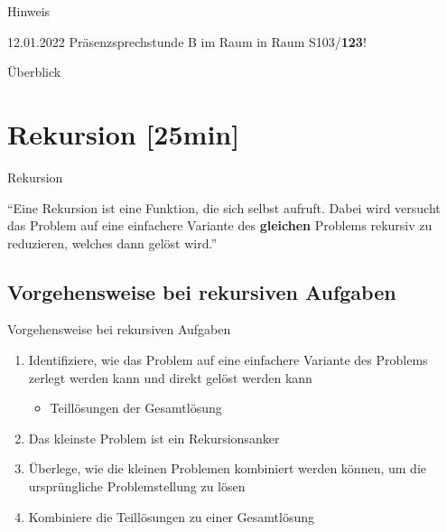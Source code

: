 \documentclass{../tuda-beamer}
\date{15. Dezember 2021}
\begin{document}
    \maketitle

    \begin{frame}[c]{Hinweis}
        \begin{center}
            12.01.2022 Präsenzsprechstunde B im Raum in Raum S103/\textbf{123}!
        \end{center}
    \end{frame}

    \begin{frame}{Überblick}
        \tableofcontents
    \end{frame}


    \section{Rekursion [25min]}
    \begin{frame}[c]{Rekursion}
        \begin{center}
            \enquote{Eine Rekursion ist eine Funktion, die sich selbst aufruft. Dabei wird versucht
            das Problem auf eine einfachere Variante des \textbf{gleichen} Problems rekursiv zu
            reduzieren, welches dann gelöst wird.}
        \end{center}
    \end{frame}

    \subsection{Vorgehensweise bei rekursiven Aufgaben}
    \begin{frame}{Vorgehensweise bei rekursiven Aufgaben}
        \begin{enumerate}
            \item Identifiziere, wie das Problem auf eine einfachere Variante des Problems
            zerlegt werden kann und direkt gelöst werden kann

            \begin{itemize}
                \item Teillösungen der Gesamtlösung
            \end{itemize}
            \item Das kleinste Problem ist ein Rekursionsanker
            \item Überlege, wie die kleinen Problemen kombiniert werden können, um die
            ursprüngliche Problemstellung zu lösen
            \item Kombiniere die Teillösungen zu einer Gesamtlösung
        \end{enumerate}
    \end{frame}
\end{document}
